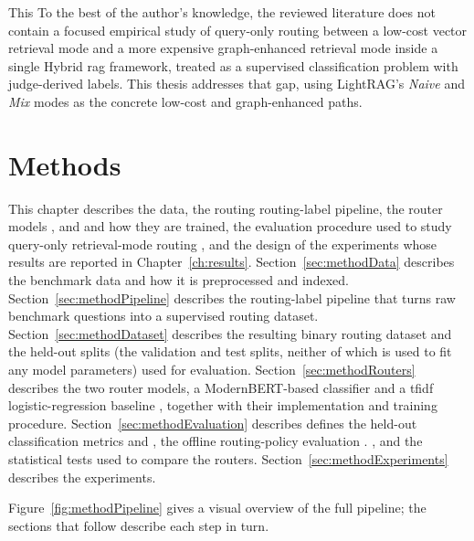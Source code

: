 \documentclass[english, bibtex]{kththesis}               %
\numberwithin{listing}{chapter}
\providecommand{\DIFaddtex}[1]{{\protect\color{blue} \sf #1}} %
\providecommand{\DIFdeltex}[1]{{\protect\color{red} \scriptsize #1}} %
\providecommand{\DIFaddbegin}{} %
\providecommand{\DIFaddend}{} %
\providecommand{\DIFdelbegin}{} %
\providecommand{\DIFdelend}{} %
\providecommand{\DIFadd}[1]{\texorpdfstring{\DIFaddtex{#1}}{#1}} %
\providecommand{\DIFdel}[1]{\texorpdfstring{\DIFdeltex{#1}}{}} %
\begin{document}
\DIFdelbegin \DIFdel{This }\DIFdelend \DIFaddbegin \DIFadd{To the best of the author's knowledge, the reviewed }\DIFaddend literature does not contain a focused empirical study of query-only routing between a low-cost vector retrieval mode and a more expensive graph-enhanced retrieval mode inside a single Hybrid \gls{rag} framework, treated as a supervised classification problem with judge-derived labels. This thesis addresses that gap, using LightRAG's \emph{Naive} and \emph{Mix} modes as the concrete low-cost and graph-enhanced paths.

\cleardoublepage
\chapter{Methods}
\label{ch:methods}

This chapter describes the data, the \DIFdelbegin \DIFdel{routing }\DIFdelend \DIFaddbegin \DIFadd{routing-label }\DIFaddend pipeline, the router models \DIFdelbegin \DIFdel{, and }\DIFdelend \DIFaddbegin \DIFadd{and how they are trained, }\DIFaddend the evaluation procedure\DIFdelbegin \DIFdel{used to study query-only retrieval-mode routing}\DIFdelend \DIFaddbegin \DIFadd{, and the design of the experiments whose results are reported in Chapter~\ref{ch:results}}\DIFaddend . Section~\ref{sec:methodData} describes the benchmark data and how it is preprocessed and indexed. Section~\ref{sec:methodPipeline} describes the routing-label pipeline that turns raw benchmark questions into a supervised routing dataset. Section~\ref{sec:methodDataset} describes the resulting binary routing dataset and the held-out splits (the validation and test splits, neither of which is used to fit any model parameters) used for evaluation. Section~\ref{sec:methodRouters} describes the two router models, a ModernBERT-based classifier and a \gls{tfidf} logistic-regression baseline\DIFaddbegin \DIFadd{, together with their implementation and training procedure}\DIFaddend . Section~\ref{sec:methodEvaluation} \DIFdelbegin \DIFdel{describes }\DIFdelend \DIFaddbegin \DIFadd{defines }\DIFaddend the held-out classification metrics\DIFdelbegin \DIFdel{and }\DIFdelend \DIFaddbegin \DIFadd{, }\DIFaddend the offline routing-policy evaluation\DIFdelbegin \DIFdel{.
}\DIFdelend \DIFaddbegin \DIFadd{, and the statistical tests used to compare the routers. Section~\ref{sec:methodExperiments} describes the experiments.
}\DIFaddend 

Figure~\ref{fig:methodPipeline} gives a visual overview of the full pipeline; the sections that follow describe each step in turn.
\end{document}
